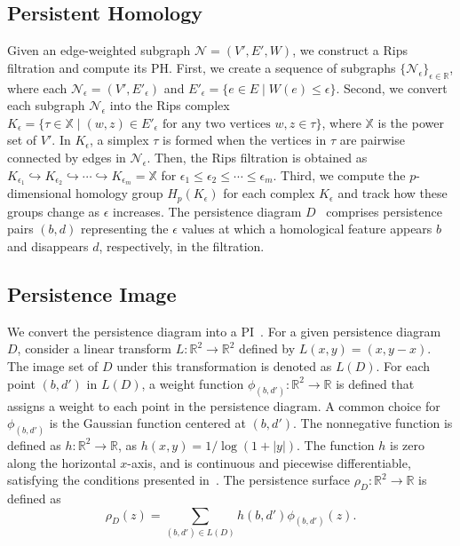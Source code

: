 \subsection{Persistent Homology}
\label{subsec:persistenthomology}

Given an edge-weighted subgraph \( \mathcal{N} = (V', E', W) \), we construct a Rips filtration and compute its PH.
First, we create a sequence of subgraphs \( \{\mathcal{N}_{\epsilon}\}_{\epsilon \in \mathbb{R}} \), where each \( \mathcal{N}_{\epsilon} = (V', E'_\epsilon) \) and \( E'_{\epsilon}= \{ e \in E \mid W(e) \leq \epsilon \} \). 
Second, we convert each subgraph \( \mathcal{N}_{\epsilon} \) into the Rips complex \( K_{\epsilon} = \{ \tau \in \mathbb{X} \mid (w,z) \in E'_{\epsilon} \text{ for any two vertices } w,z \in \tau \}\), where $\mathbb{X}$ is the power set of $V'$. 
In \(K_{\epsilon}\), a simplex $\tau$ is formed when the vertices in \( \tau \) are pairwise connected by edges in \( \mathcal{N}_{\epsilon} \).
Then, the Rips filtration is obtained as \( K_{\epsilon_1} \hookrightarrow K_{\epsilon_2} \hookrightarrow \cdots \hookrightarrow K_{\epsilon_m} = \mathbb{X} \)
for $\epsilon_1 \le \epsilon_2 \le \cdots \le \epsilon_m $.
Third, we compute the $p$-dimensional homology group \( H_p(K_{\epsilon}) \) for each complex \( K_{\epsilon}\) and track how these groups change as \( \epsilon \) increases. 
The persistence diagram $D$~\cite{edelsbrunner2002topological} comprises
persistence pairs \((b,d)\) representing the \(\epsilon\) values at which a homological feature appears $b$ and disappears $d$, respectively, in the filtration.

\subsection{Persistence Image}
\label{subsec:persistenceimage}

We convert the persistence diagram into a PI~\cite{adams2017persistence}. 
For a given persistence diagram \( D \),
consider a linear transform \( L: \mathbb{R}^2 \rightarrow \mathbb{R}^2 \) defined by \( L(x, y) = (x, y-x) \). 
The image set of \( D \) under this transformation is denoted as \( L(D) \). 
For each point $(b,d')$ in $L(D)$, a weight function \( \phi_{(b,d')}: \mathbb{R}^2 \rightarrow \mathbb{R} \) is defined that assigns a weight to each point in the persistence diagram. 
A common choice for \( \phi_{(b,d')} \) is the Gaussian function centered at $(b,d')$.
The nonnegative function is defined as $h:\mathbb{R}^2 \rightarrow \mathbb{R}$, as $h(x,y)=1/\log(1+ \lvert y \rvert)$.
The function $h$ is zero along the horizontal $x$-axis, and is continuous and piecewise differentiable, satisfying the conditions presented in~\cite{adams2017persistence}.
The persistence surface $\rho_D:\mathbb{R}^2 \rightarrow \mathbb{R}$ is defined as
\[
\rho_D(z) = \sum_{(b,d') \in L(D)} h(b,d')\phi_{(b,d')}(z).
\]

